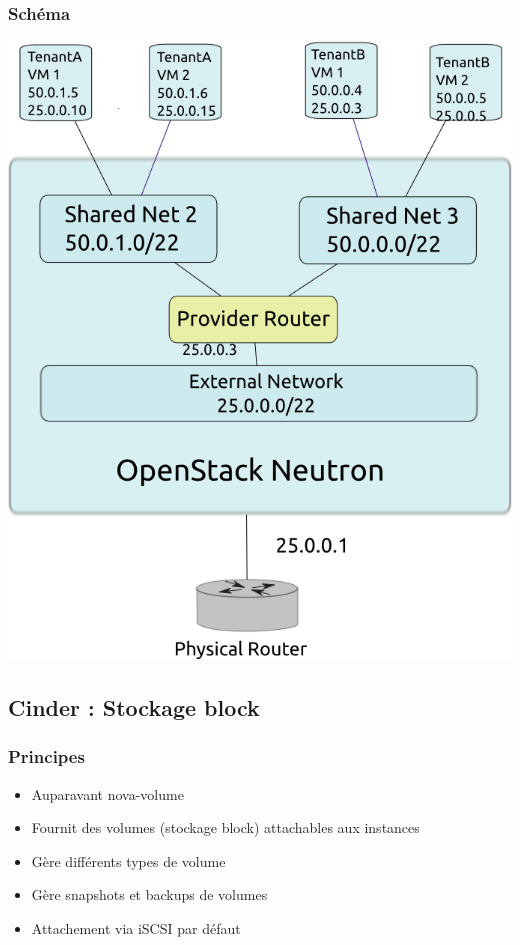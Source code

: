   \begin{frame}
    \frametitle{Schéma}
    \includegraphics[width=\textwidth,height=\textheight]{images/neutron-schema.png}
  \end{frame}

  \subsection[Cinder]{Cinder : Stockage block}

  \begin{frame}
    \frametitle{Principes}
    \begin{itemize}
      \item Auparavant nova-volume
      \item Fournit des volumes (stockage block) attachables aux instances
      \item Gère différents types de volume
      \item Gère snapshots et backups de volumes
      \item Attachement via iSCSI par défaut
    \end{itemize}
  \end{frame}

